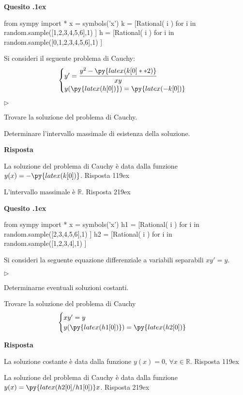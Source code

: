 \documentclass[11pt,twoside,a4paper]{article}
\newcommand{\mylabel}[1]{#1\hfill}
\renewenvironment{itemize}
  {\begin{list}{$\triangleright$}{%
   \setlength{\parskip}{0mm}
   \setlength{\topsep}{.4\baselineskip}
   \setlength{\rightmargin}{0mm}
   \setlength{\listparindent}{0mm}
   \setlength{\itemindent}{0mm}
   \setlength{\labelwidth}{2ex}
   \setlength{\itemsep}{.4\baselineskip}
   \setlength{\parsep}{0mm}
   \setlength{\partopsep}{0mm}
   \setlength{\labelsep}{1ex}
   \setlength{\leftmargin}{\labelwidth+\labelsep}
   \let\makelabel\mylabel}}{%
   \end{list}\vspace*{-1.3mm}}
\newcounter{quesito}
\newenvironment{question}{\bigskip\addtocounter{quesito}{1}\bigskip\bigskip\par\textbf{Quesito \thequesito.\kern1ex}}{\vspace{\parskip}}
\newenvironment{answer}{\par\textbf{Risposta\quad}}{\vspace{\parskip}}
\begin{document}
\begin{question}
\begin{pycode}
from sympy import *
x = symbols('x')
k = [Rational( i ) for i in random.sample([1,2,3,4,5,6],1) ]
h = [Rational( i ) for i in random.sample([0,1,2,3,4,5,6],1) ]
\end{pycode}
Si consideri il seguente problema di Cauchy:
\[\begin{cases} y' = \cfrac{y^2 - \py{latex(k[0]**2)}}{xy} \cr y(\py{latex(h[0])}) = \py{latex(-k[0])} \end{cases}\]
\begin{itemize}
\item[1.] Trovare la soluzione del problema di Cauchy.
\item[2.] Determinare l'intervallo massimale di esistenza della soluzione.

\end{itemize}
\begin{answer}

{\color{blue}
La soluzione del problema di Cauchy \`e data dalla funzione $y(x) = -\py{latex(k[0])}$.
\hfill Risposta 1\kern19ex}

\smallskip
{\color{blue} L'intervallo massimale \`e $\mathbb R$.
\hfill Risposta 2\kern19ex}

\end{answer}
\end{question}
\begin{question}
\begin{pycode}
from sympy import *
x = symbols('x')
h1 = [Rational( i ) for i in random.sample([2,3,4,5,6],1) ]
h2 = [Rational( i ) for i in random.sample([1,2,3,4],1) ]
\end{pycode}
Si consideri la seguente equazione differenziale a variabili separabili \(xy' = y\).
\begin{itemize}
\item[1.] Determinarne eventuali soluzioni costanti.
\item[2.] Trovare la soluzione del problema di Cauchy
\[\begin{cases} xy' = y \cr y(\py{latex(h1[0])}) = \py{latex(h2[0])}  \end{cases}\]
\end{itemize}
\begin{answer}

{\color{blue}
La soluzione costante \`e data dalla funzione $y(x) = 0$, $\forall x \in \mathbb R$.
\hfill Risposta 1\kern19ex}

\smallskip
{\color{blue} La soluzione del problema di Cauchy \`e data dalla funzione $y(x) = \py{latex(h2[0]/h1[0])}x$.
\hfill Risposta 2\kern19ex}

\end{answer}
\end{question}
\end{document}
